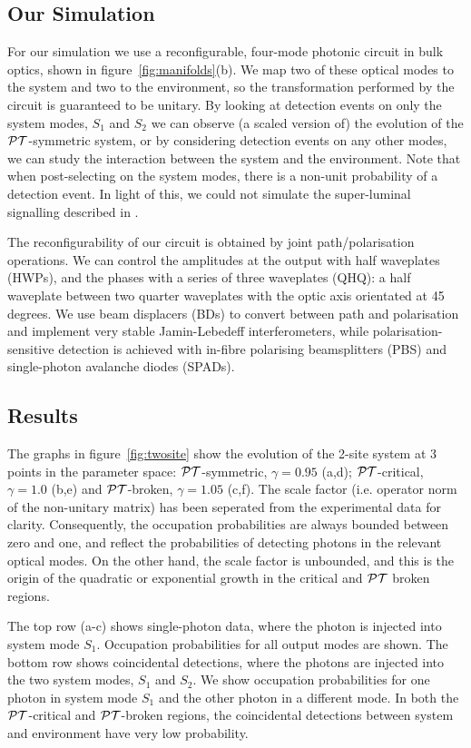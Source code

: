 \subsection{Our Simulation}
For our simulation we use a reconfigurable, four-mode photonic circuit in bulk
optics, shown in figure~\ref{fig:manifolds}(b). We map two of these optical
modes to the system and two to the environment, so the transformation performed
by the circuit is guaranteed to be unitary. By looking at detection events on
only the system modes, \(S_1\) and \(S_2\) we can observe (a scaled version of)
the evolution of the \(\mathcal{PT}{}\)-symmetric system, or by considering detection
events on any other modes, we can study the interaction between the system and
the environment. Note that when post-selecting on the system modes, there is a
non-unit probability of a detection event. In light of this, we could not
simulate the super-luminal signalling described in \cite{lee-prl-112-130404}.

The reconfigurability of our circuit is obtained by joint path/polarisation
operations. We can control the amplitudes at the output with half waveplates
(HWPs), and the phases with a series of three waveplates (QHQ): a half waveplate
between two quarter waveplates with the optic axis orientated at 45 degrees.
We use beam displacers (BDs) to convert between path and polarisation and
implement very stable Jamin-Lebedeff interferometers, while
polarisation-sensitive detection is achieved with in-fibre polarising
beamsplitters (PBS) and single-photon avalanche diodes (SPADs).

\subsection{Results}
The graphs in figure~\ref{fig:twosite} show the evolution of the 2-site system
at 3 points in the parameter space: \(\mathcal{PT}{}\)-symmetric, \(\gamma=0.95\) (a,d);
\(\mathcal{PT}{}\)-critical, \(\gamma=1.0\) (b,e) and \(\mathcal{PT}{}\)-broken, \(\gamma=1.05\)
(c,f). The scale factor (i.e. operator norm of the non-unitary matrix) has been
seperated from the experimental data for clarity. Consequently, the occupation
probabilities are always bounded between zero and one, and reflect the
probabilities of detecting photons in the relevant optical modes. On the other
hand, the scale factor is unbounded, and this is the origin of the quadratic or
exponential growth in the critical and \(\mathcal{PT}{}\) broken regions.

The top row (a-c) shows single-photon data, where the photon is injected into
system mode \(S_1\). Occupation probabilities for all output modes are shown.
The bottom row shows coincidental detections, where the photons are injected
into the two system modes, \(S_1\) and \(S_2\). We show occupation probabilities
for one photon in system mode \(S_1\) and the other photon in a different mode.
In both the \(\mathcal{PT}{}\)-critical and \(\mathcal{PT}{}\)-broken regions, the coincidental
detections between system and environment have very low probability.

